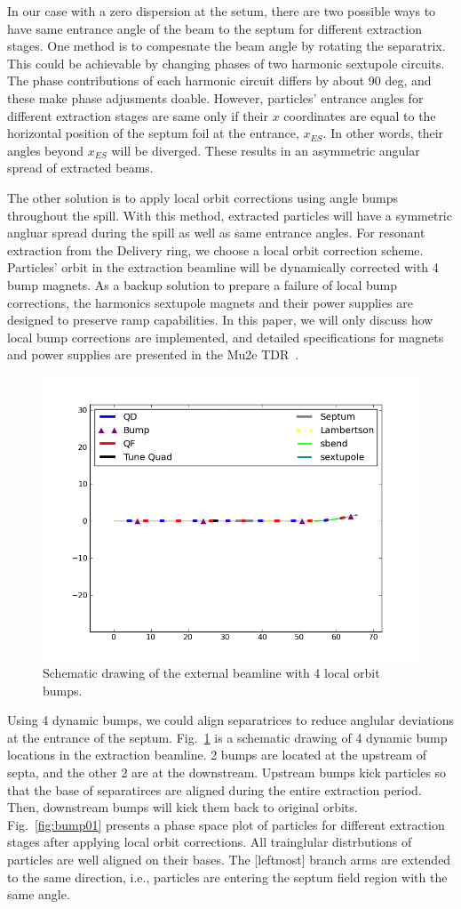 \documentclass[aps,prstab,onecolumn,preprint,endfloats,11pt]{revtex4-1}
\begin{document}
In our case with a zero dispersion at the setum, there are two possible ways to have same entrance angle of the beam to the septum for different extraction stages.
One method is to compesnate the beam angle by rotating the separatrix. This could be achievable by changing phases of two harmonic sextupole circuits.
The phase contributions of each harmonic circuit differs by about 90 deg, and these make phase adjusments doable.
However, particles' entrance angles for different extraction stages are same only if their $x$ coordinates are equal to the horizontal position of the septum foil at the entrance, $x_{ES}$.
In other words, their angles beyond $x_{ES}$ will be diverged.
These results in an asymmetric angular spread of extracted beams.

The other solution is to apply local orbit corrections using angle bumps throughout the spill.
With this method, extracted particles will have a symmetric angluar spread during the spill as well as same entrance angles.
For resonant extraction from the Delivery ring, we choose a local orbit correction scheme.
Particles' orbit in the extraction beamline will be dynamically corrected with 4 bump magnets.
As a backup solution to prepare a failure of local bump corrections, the harmonics sextupole magnets and their power supplies are designed to preserve ramp capabilities.
In this paper, we will only discuss how local bump corrections are implemented, and detailed specifications for magnets and power supplies are presented in the Mu2e TDR~\cite{tdr}.

\begin{figure}[!tbp]
  \includegraphics[width=.45\textwidth]{img/20140109-00.png}
  \caption{\label{fig:bump1}Schematic drawing of the external beamline with 4 local orbit bumps.}
\end{figure}

Using 4 dynamic bumps, we could align separatrices to reduce anglular deviations at the entrance of the septum.
Fig.~\ref{fig:bump1} is a schematic drawing of 4 dynamic bump locations in the extraction beamline.
2 bumps are located at the upstream of septa, and the other 2 are at the downstream.
Upstream bumps kick particles so that the base of separatirces are aligned during the entire extraction period.
Then, downstream bumps will kick them back to original orbits.
Fig.~\ref{fig:bump01} presents a phase space plot of particles for different extraction stages after applying local orbit corrections.
All trainglular distrbutions of particles are well aligned on their bases.
The [leftmost] branch arms are extended to the same direction, i.e., particles are entering the septum field region with the same angle.
\end{document}
